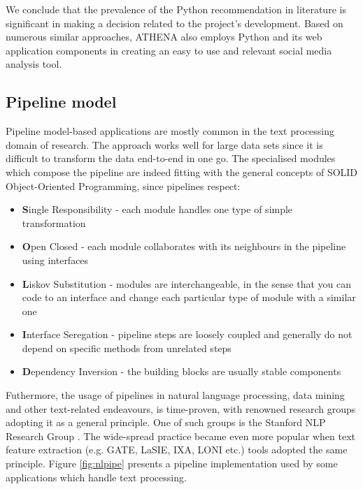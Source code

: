 We conclude that the prevalence of the Python recommendation in literature is significant in making a decision related to the project's development. Based on numerous similar approaches, ATHENA also employs Python and its web application components in creating an easy to use and relevant social media analysis tool.

\subsection{Pipeline model}
Pipeline model-based applications are mostly common in the text processing domain of research. The approach works well for large data sets since it is difficult to transform the data end-to-end in one go. The specialised modules which compose the pipeline are indeed fitting with the general concepts of SOLID Object-Oriented Programming, since pipelines respect:

\begin{itemize}
\item \textbf{S}ingle Responsibility - each module handles one type of simple transformation
\item \textbf{O}pen Closed - each module collaborates with its neighbours in the pipeline using interfaces
\item \textbf{L}iskov Substitution - modules are interchangeable, in the sense that you can code to an interface and change each particular type of module with a similar one
\item \textbf{I}nterface Seregation - pipeline steps are loosely coupled and generally do not depend on specific methods from unrelated steps
\item \textbf{D}ependency Inversion - the building blocks are usually stable components
\end{itemize}

Futhermore, the usage of pipelines in natural language processing, data mining and other text-related endeavours, is time-proven, with renowned research groups adopting it as a general principle. One of such groups is the Stanford NLP Research Group \cite{manning2014stanford}. The wide-spread practice became even more popular when text feature extraction (e.g. GATE, LaSIE, IXA, LONI etc.) tools adopted the same principle. Figure \ref{fig:nlpipe} presents a pipeline implementation used by some applications which handle text processing.

